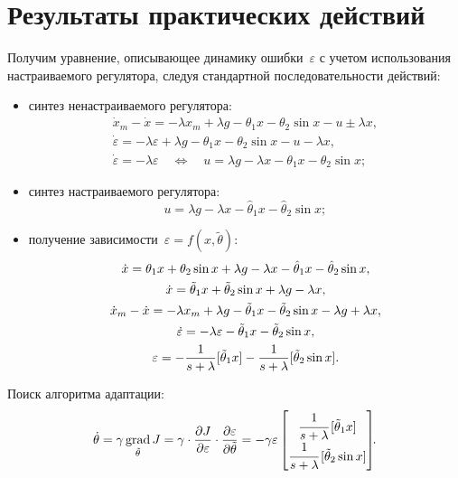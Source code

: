 \section{Результаты практических действий}
Получим уравнение, описывающее динамику ошибки~$\varepsilon$ с учетом использования настраиваемого регулятора, следуя стандартной последовательности действий:
\begin{itemize}
    \item синтез ненастраиваемого регулятора:
    \begin{gather}
        \dot{x}_m - \dot{x} = -\lambda x_m + \lambda g - \theta_1 x - \theta_2 \sin{x} - u \pm \lambda x,
        \\
        \dot{\varepsilon} = -\lambda \varepsilon + \lambda g - \theta_1 x - \theta_2 \sin{x} - u - \lambda x,
        \\
        \dot{\varepsilon} = -\lambda \varepsilon
        \quad \Leftrightarrow \quad
        u = \lambda g - \lambda x - \theta_1 x - \theta_2 \sin{x};
    \end{gather}
    \item синтез настраиваемого регулятора:
    \begin{equation}
        u = \lambda g - \lambda x - \hat{\theta}_1 x - \hat{\theta}_2 \sin{x};
    \end{equation}
    \item получение зависимости~$\varepsilon = f(x, \tilde\theta)$:
    \begin{gather}
        \dot{x} = \theta_1 x + \theta_2 \sin{x} + \lambda g - \lambda x - \hat{\theta}_1 x - \hat{\theta}_2 \sin{x},
        \\
        \dot{x} = \tilde{\theta}_1 x + \tilde{\theta}_2 \sin{x} + \lambda g - \lambda x,
        \\
        \dot{x}_m - \dot{x} = -\lambda x_m + \lambda g - \tilde{\theta}_1 x - \tilde{\theta}_2 \sin{x} - \lambda g + \lambda x,
        \\
        \dot{\varepsilon} = -\lambda \varepsilon - \tilde{\theta}_1 x - \tilde{\theta}_2 \sin{x},
        \\
        \varepsilon = -\frac{1}{s + \lambda} [\tilde{\theta}_1 x] - \frac{1}{s + \lambda} [\tilde{\theta}_2 \sin{x}] \ldotp
    \end{gather}
\end{itemize}

Поиск алгоритма адаптации:
\begin{equation}
    \dot{\theta} = \gamma \operatorname*{grad}_{\tilde{\theta}} J = \gamma \cdot \frac{\partial J}{\partial \varepsilon} \cdot \frac{\partial \varepsilon}{\partial \tilde{\theta}} = - \gamma \varepsilon
    \begin{bmatrix}
        \cfrac{1}{s + \lambda} \, [\tilde{\theta}_1 x] \\ \cfrac{1}{s + \lambda} \, [\tilde{\theta}_2 \sin{x}]
    \end{bmatrix}\!\! \ldotp
\end{equation}

